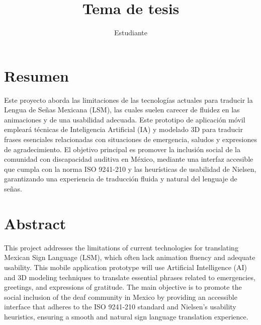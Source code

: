 \documentclass[12pt, letterpaper,oneside]{book}
\title{Tema de tesis}
\author{Estudiante}
\begin{document}
	\renewcommand{\listtablename}{{Índice de tablas}}
	\renewcommand{\tablename}{Tabla}
	

	
\section*{Resumen}
Este proyecto aborda las limitaciones de las tecnologías actuales para traducir la Lengua de Señas Mexicana (LSM), las cuales suelen carecer de fluidez en las animaciones y de una usabilidad adecuada. Este prototipo de aplicación móvil empleará técnicas de Inteligencia Artificial (IA) y modelado 3D para traducir frases esenciales relacionadas con situaciones de emergencia, saludos y expresiones de agradecimiento. El objetivo principal es promover la inclusión social de la comunidad con discapacidad auditiva en México, mediante una interfaz accesible que cumpla con la norma ISO 9241-210 y las heurísticas de usabilidad de Nielsen, garantizando una experiencia de traducción fluida y natural del lenguaje de señas.\\

\section*{Abstract}
This project addresses the limitations of current technologies for translating Mexican Sign Language (LSM), which often lack animation fluency and adequate usability. This mobile application prototype will use Artificial Intelligence (AI) and 3D modeling techniques to translate essential phrases related to emergencies, greetings, and expressions of gratitude. The main objective is to promote the social inclusion of the deaf community in Mexico by providing an accessible interface that adheres to the ISO 9241-210 standard and Nielsen's usability heuristics, ensuring a smooth and natural sign language translation experience.
\newpage\null\thispagestyle{empty}\newpage

\tableofcontents
\listoffigures     %
\listoftables      %




%
%
%
\end{document}
